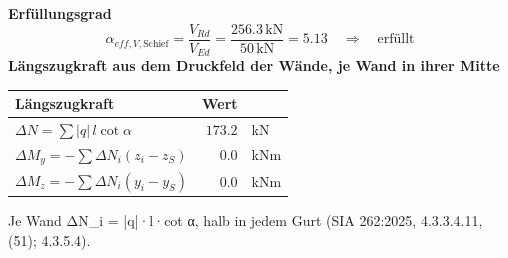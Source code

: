 \documentclass[11pt,a4paper]{article}
\begin{document}
\noindent\textbf{Erfüllungsgrad}
\begin{equation*}
\alpha_{eff,V,\text{Schief}} = \frac{V_{Rd}}{V_{Ed}} = \frac{256.3\,\mathrm{kN}}{50\,\mathrm{kN}} = 5.13 \quad \Rightarrow \quad \text{erfüllt}
\end{equation*}
\noindent\textbf{Längszugkraft aus dem Druckfeld der Wände, je Wand in ihrer Mitte}
\begin{longtable}{lrl}
\hline
Längszugkraft & Wert &  \\
\hline
\endhead
$\Delta N = \sum |q|\, l \cot\alpha$ & $173.2$ & kN \\
$\Delta M_y = -\sum \Delta N_i (z_i - z_S)$ & $0.0$ & kNm \\
$\Delta M_z = -\sum \Delta N_i (y_i - y_S)$ & $0.0$ & kNm \\
\hline
\end{longtable}
Je Wand ΔN\_i = |q|·l·cot α, halb in jedem Gurt (SIA 262:2025, 4.3.3.4.11, (51); 4.3.5.4).
\end{document}
